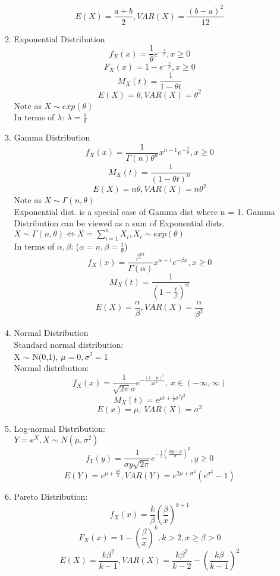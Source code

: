 \documentclass[10pt]{article}
\begin{document}
\begin{multicols}{2}
\begin{enumerate}
\begin{enumerate}
				$$E(X) = \frac{a+b}{2}, VAR(X) = \frac{(b-a)^2}{12}$$
				\item Exponential Distribution\\
				$$f_X(x) = \frac{1}{\theta}e^{-\frac{x}{\theta}}, x \ge 0$$
				$$F_X(x) = 1- e^{-\frac{x}{\theta}}, x \ge 0$$
				$$M_X(t) = \frac{1}{1-\theta t}$$
				$$E(X) = \theta, VAR(X) = \theta^2$$
				Note as $X \sim exp(\theta)$\\
				In terms of $\lambda$: $\lambda = \frac{1}{\theta}$ 
				\item Gamma Distribution\\
				$$f_X(x)= \frac{1}{\Gamma(n)\theta^n}x^{n-1}e^{-\frac{x}{\theta}}, x \ge 0$$
				$$M_X(t) = \frac{1}{(1-\theta t)^n}$$
				$$E(X) = n\theta, VAR(X) = n\theta^2$$
				Note as $X \sim \Gamma(n,\theta)$\\
				Exponential dist. is a special case of Gamma dist where n = 1. Gamma Distribution can be viewed as a sum of Exponential dists.\\
				$X \sim \Gamma(n,\theta) \Leftrightarrow X = \sum_{i = 1}^{n} X_i, X_i \sim exp(\theta)$\\
				In terms of $\alpha, \beta$: ($\alpha = n, \beta = \frac{1}{\theta}$)
				$$f_X(x)= \frac{\beta^\alpha}{\Gamma(\alpha)}x^{\alpha-1}e^{-\beta x}, x \ge 0$$
				$$M_X(t) = \frac{1}{(1-\frac{t}{\beta})^\alpha}$$
				$$E(X) = \frac{\alpha}{\beta}, VAR(X) = \frac{\alpha}{\beta^2}$$
				\item Normal Distribution\\
				Standard normal distribution: \\
				X $\sim$ N(0,1), $\mu = 0,\sigma^2 = 1$\\
				Normal distribution:
				$$f_X(x) = \frac{1}{\sqrt{2\pi}\sigma} e^{-\frac{(x-\mu)^2}{2\sigma^2}}, \ x \in (-\infty, \infty)$$
				$$M_X(t) = e^{\mu t + \frac{1}{2}\sigma^2 t^2}$$
				$$E(x) = \mu, \ VAR(X) = \sigma^2$$
				\item Log-normal Distribution:\\
				$Y = e^X, X \sim N(\mu, \sigma^2)$
				$$f_Y(y) = \frac{1}{\sigma y \sqrt{2 \pi}}e^{-\frac{1}{2}(\frac{lny - \mu}{\sigma})^2}, y \ge 0$$
				$$E(Y) = e^{\mu+\frac{\sigma^2}{2}}, VAR(Y) = e^{2\mu + \sigma^2}(e^{\sigma^2} - 1)$$
				\item Pareto Distribution:\\
				$$f_X(x) = \frac{k}{\beta}(\frac{\beta}{x})^{k+1}$$
				$$F_X(x) = 1 - (\frac{\beta}{x})^k, k > 2, x \ge \beta >0$$
				$$E(X) = \frac{k\beta^2}{k-1}, VAR(X) = \frac{k\beta^2}{k-2} - (\frac{k\beta}{k-1})^2$$

\end{enumerate}
\end{enumerate}
\end{multicols}
\end{document}

